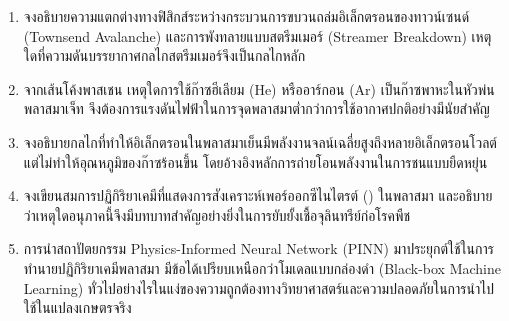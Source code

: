 \begin{enumerate}
    \item จงอธิบายความแตกต่างทางฟิสิกส์ระหว่างกระบวนการขบวนถล่มอิเล็กตรอนของทาวน์เซนด์ (Townsend Avalanche) และการพังทลายแบบสตรีมเมอร์ (Streamer Breakdown) เหตุใดที่ความดันบรรยากาศกลไกสตรีมเมอร์จึงเป็นกลไกหลัก
    \item จากเส้นโค้งพาสเชน เหตุใดการใช้ก๊าซฮีเลียม (He) หรืออาร์กอน (Ar) เป็นก๊าซพาหะในหัวพ่นพลาสมาเจ็ท จึงต้องการแรงดันไฟฟ้าในการจุดพลาสมาต่ำกว่าการใช้อากาศปกติอย่างมีนัยสำคัญ
    \item จงอธิบายกลไกที่ทำให้อิเล็กตรอนในพลาสมาเย็นมีพลังงานจลน์เฉลี่ยสูงถึงหลายอิเล็กตรอนโวลต์ แต่ไม่ทำให้อุณหภูมิของก๊าซร้อนขึ้น โดยอ้างอิงหลักการถ่ายโอนพลังงานในการชนแบบยืดหยุ่น
    \item จงเขียนสมการปฏิกิริยาเคมีที่แสดงการสังเคราะห์เพอร์ออกซีไนไตรต์ () ในพลาสมา และอธิบายว่าเหตุใดอนุภาคนี้จึงมีบทบาทสำคัญอย่างยิ่งในการยับยั้งเชื้อจุลินทรีย์ก่อโรคพืช
    \item การนำสถาปัตยกรรม Physics-Informed Neural Network (PINN) มาประยุกต์ใช้ในการทำนายปฏิกิริยาเคมีพลาสมา มีข้อได้เปรียบเหนือกว่าโมเดลแบบกล่องดำ (Black-box Machine Learning) ทั่วไปอย่างไรในแง่ของความถูกต้องทางวิทยาศาสตร์และความปลอดภัยในการนำไปใช้ในแปลงเกษตรจริง
\end{enumerate}

\clearpage
